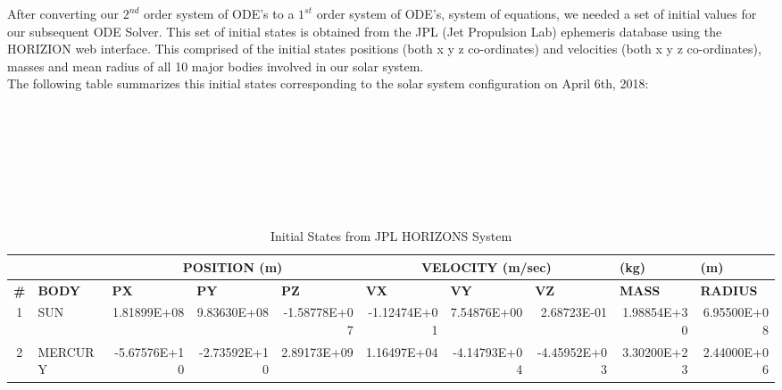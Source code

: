 \documentclass[a4paper]{article}
\begin{document}
\pagebreak

\begin{landscape}
After converting our $2^{nd}$ order system of ODE's to a $1^{st}$ order system of ODE's, system of equations, we needed a set of initial values for our subsequent ODE Solver. This set of initial states is obtained from the JPL (Jet Propulsion Lab) ephemeris database using the HORIZION web interface. This comprised of the initial states positions (both x y z co-ordinates) and velocities (both x y z co-ordinates), masses and mean radius of all 10 major bodies involved in our solar system.\\

The following table summarizes this initial states corresponding to the solar system configuration on April 6th, 2018:
\\\\\\\\\\\\\\\\
\begin{table}[htbp]
  \centering
  \caption{Initial States from JPL HORIZONS System}
    \begin{tabular}{|c|l|r|r|r|r|r|r|r|r|}
\cmidrule{3-10}    \multicolumn{1}{r}{} &            & \multicolumn{3}{c|}{\cellcolor[rgb]{ .788,  .788,  .788}\textbf{POSITION (m)}} & \multicolumn{3}{c|}{\cellcolor[rgb]{ .788,  .788,  .788}\textbf{VELOCITY (m/sec)}} & \multicolumn{1}{l|}{\cellcolor[rgb]{ .788,  .788,  .788}\textbf{(kg)}} & \multicolumn{1}{l|}{\cellcolor[rgb]{ .788,  .788,  .788}\textbf{(m)}} \\
    \midrule
    \multicolumn{1}{|l|}{\textbf{\#}} & \textbf{BODY} & \multicolumn{1}{l|}{\textbf{PX}} & \multicolumn{1}{l|}{\textbf{PY}} & \multicolumn{1}{l|}{\textbf{PZ}} & \multicolumn{1}{l|}{\textbf{VX}} & \multicolumn{1}{l|}{\textbf{VY}} & \multicolumn{1}{l|}{\textbf{VZ}} & \multicolumn{1}{l|}{\textbf{MASS}} & \multicolumn{1}{l|}{\textbf{RADIUS}} \\
    \midrule
    \rowcolor[rgb]{ .851,  .882,  .949} 1          & SUN        & 1.81899E+08 & 9.83630E+08 & -1.58778E+07 & -1.12474E+01 & 7.54876E+00 & 2.68723E-01 & 1.98854E+30 & 6.95500E+08 \\
    \midrule
    2          & MERCURY    & -5.67576E+10 & -2.73592E+10 & 2.89173E+09 & 1.16497E+04 & -4.14793E+04 & -4.45952E+03 & 3.30200E+23 & 2.44000E+06 \\

\end{tabular}
\end{table}
\end{landscape}
\end{document}
